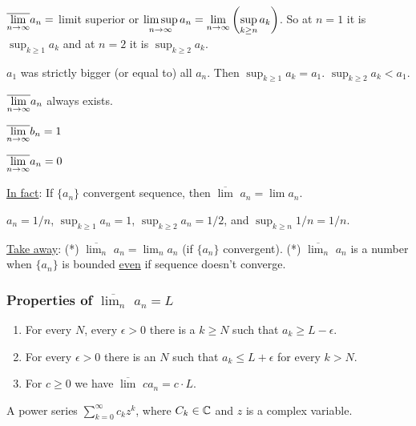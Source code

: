 \documentclass[]{article}
\begin{document}
\begin{definition}
	$\displaystyle \overline{\lim_{n\rightarrow\infty}}a_n = $ limit superior or $\displaystyle \limsup_{n\rightarrow\infty} a_n = \lim_{n\rightarrow\infty} \left(\sup_{k\geq n} a_k\right)$. So at $n=1$ it is $\displaystyle \sup_{k\geq 1} a_k$ and at $n=2$ it is $\displaystyle \sup_{k\geq 2} a_k$.
\end{definition}
\begin{example}
	$a_1$ was strictly bigger (or equal to) all $a_n$. Then $\displaystyle\sup_{k\geq 1} a_k = a_1$. $\displaystyle\sup_{k\geq 2} a_k < a_1$.
\end{example}
$\displaystyle \overline{\lim_{n\rightarrow\infty}} a_n$ always exists.
\begin{example}
	$\displaystyle \overline{\lim_{n\rightarrow \infty}} b_n = 1$
\end{example}
\begin{example}
	$\displaystyle \overline{\lim_{n\rightarrow \infty}} a_n = 0$
\end{example}

\underline{In fact}: If $\{a_n\}$ convergent sequence, then $\overline{\lim}$ $ a_n = \lim a_n$.
\begin{example}
	$a_n=1/n$, $\sup_{k\geq 1} a_n = 1$, $\sup_{k\geq 2} a_n = 1/2$, and $\displaystyle \sup_{k\geq n} 1/n = 1/n$.
\end{example}

\underline{Take away}: (*) $\displaystyle \overline{\lim_n}$ $\displaystyle a_n = \lim_n a_n$ (if $\{a_n\}$ convergent). (*) $\displaystyle \overline{\lim_n}$ $ a_n$ is a number when $\{a_n\}$ is bounded \underline{even} if sequence doesn't converge.

\subsubsection{Properties of $\displaystyle \overline{\lim_n}$  $a_n = L$}
\begin{enumerate}
	\item For every $N$, every $\epsilon>0$ there is a $k\geq N$ such that $a_k \geq L-\epsilon$.
	\item For every $\epsilon>0$ there is an $N$ such that $a_k \leq L+\epsilon$ for every $k> N$.
	\item For $c\geq 0$ we have $\overline{\lim}$ $ca_n = c\cdot L$.
\end{enumerate}
\begin{definition}
	A power series $\displaystyle \sum_{k=0}^\infty c_k z^k$, where $C_k\in\mathbb{C}$ and $z$ is a complex variable.
\end{definition}
\end{document}
